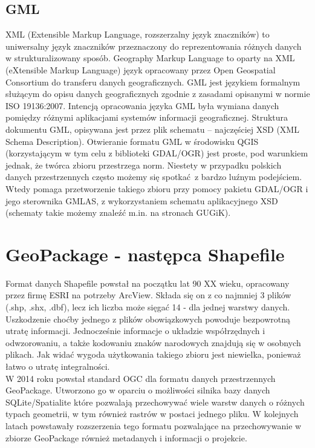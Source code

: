 \documentclass[a4paper,11pt, onecolumn, openany]{memoir}
\begin{document}
			\subsection{GML}
			XML (Extensible Markup Language, rozszerzalny język znaczników) to uniwersalny język znaczników przeznaczony do reprezentowania różnych danych w strukturalizowany sposób. Geography Markup Language to oparty na XML (eXtensible Markup Language) język opracowany przez Open Geospatial Consortium do transferu danych geograficznych. GML jest językiem formalnym służącym do opisu danych geograficznych zgodnie z zasadami opisanymi w normie ISO 19136:2007. Intencją opracowania języka GML była wymiana danych pomiędzy różnymi aplikacjami systemów informacji geograficznej. Struktura dokumentu GML, opisywana jest przez plik schematu – najczęściej XSD (XML Schema Description). Otwieranie formatu GML w środowisku QGIS (korzystającym w tym celu z biblioteki GDAL/OGR) jest proste, pod warunkiem jednak, że twórca zbioru przestrzega norm. Niestety w przypadku polskich danych przestrzennych często możemy się spotkać z bardzo luźnym podejściem. Wtedy pomaga przetworzenie takiego zbioru przy pomocy pakietu GDAL/OGR i jego sterownika GMLAS, z wykorzystaniem schematu aplikacyjnego XSD (schematy takie możemy znaleźć m.in. na stronach GUGiK). 			
		\section{GeoPackage - następca Shapefile}
		    Format danych Shapefile powstał na początku lat 90 XX wieku, opracowany przez firmę ESRI na potrzeby ArcView. Składa się on z co najmniej 3 plików (.shp, .shx, .dbf), lecz ich liczba może sięgać 14 - dla jednej warstwy danych. Uszkodzenie choćby jednego z plików obowiązkowych powoduje bezpowrotną utratę informacji. Jednocześnie informacje o układzie współrzędnych i odwzorowaniu, a także kodowaniu znaków narodowych znajdują się w osobnych plikach. Jak widać wygoda użytkowania takiego zbioru jest niewielka, ponieważ łatwo o utratę integralności.\\
		    W 2014 roku powstał standard OGC dla formatu danych przestrzennych GeoPackage. Utworzono go w oparciu o możliwości silnika bazy danych SQLite/Spatialite które pozwalają przechowywać wiele warstw danych o różnych typach geometrii, w tym również rastrów w postaci jednego pliku. W kolejnych latach powstawały rozszerzenia tego formatu pozwalające na przechowywanie w zbiorze GeoPackage również metadanych i informacji o projekcie. 
\end{document}
